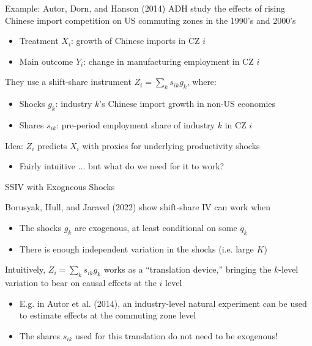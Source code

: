 \documentclass{beamer}
\begin{document}
\begin{frame}{Example: Autor, Dorn, and Hanson (2014)}
ADH study the effects of rising Chinese import competition on US commuting zones in the 1990's and 2000's
\begin{itemize}
\item Treatment $X_{i}$: growth of Chinese imports in CZ $i$
\item Main outcome $Y_{i}$: change in manufacturing employment in CZ $i$
\end{itemize}\medskip\pause{}

They use a shift-share instrument $Z_{i}=\sum_k s_{ik}g_{k}$, where:
\begin{itemize}
\item Shocks $g_k$: industry $k$'s Chinese import growth in non-US economies
\item Shares $s_{ik}$: pre-period employment share of industry $k$ in CZ $i$
\end{itemize}\medskip\pause{}

Idea: $Z_i$ predicts $X_i$ with proxies for underlying productivity shocks  
\begin{itemize}
\item Fairly intuitive ... but what do we need for it to work? 
\end{itemize}
\end{frame}

\begin{frame}{SSIV with Exogneous Shocks}

Borusyak, Hull, and Jaravel (2022) show shift-share IV can work when
\begin{itemize}
\item The shocks $g_k$ are exogenous, at least conditional on some $q_k$
\item There is enough independent variation in the shocks (i.e. large $K$)
\end{itemize}\bigskip\pause{}

Intuitively, $Z_i=\sum_k s_{ik}g_{k}$ works as a ``translation device,'' bringing the $k$-level variation to bear on causal effects at the $i$ level
\begin{itemize}
\item E.g. in Autor et al. (2014), an industry-level natural experiment can be used to estimate effects at the commuting zone level
\item The shares $s_{ik}$ used for this translation do not need to be exogenous!
\end{itemize}

\end{frame}
\end{document}
